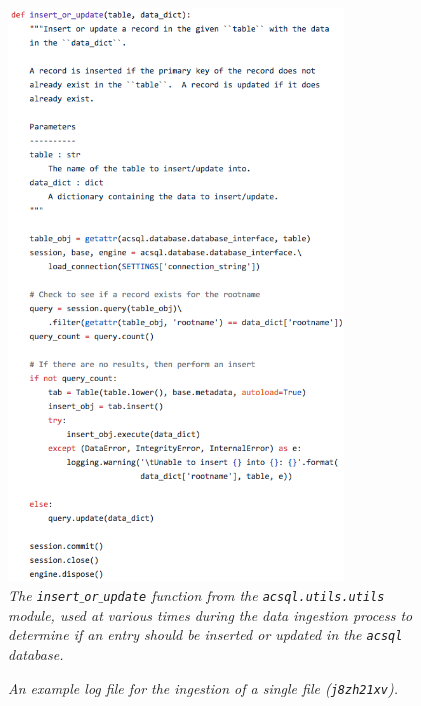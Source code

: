 \documentclass[10pt,journal,compsoc]{IEEEtran}
\begin{document}
\begin{figure}[!t]
\centering
\includegraphics[width=3.5in]{./figures/insert_or_update.png}
\caption{\textit{The \texttt{insert$\_$or$\_$update} function from the \texttt{acsql.utils.utils} module, used at various times during the data ingestion process to determine if an
entry should be inserted or updated in the \texttt{acsql} database.}}
\label{fig19}
\end{figure}

\begin{figure}[!t]
\centering
{}
\caption{\textit{An example log file for the ingestion of a single file (\texttt{j8zh21xv}).}}
\label{fig20}
\end{figure}
\end{document}
